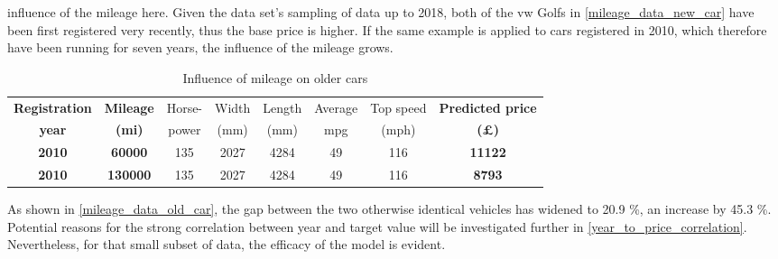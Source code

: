 influence of the mileage here.
Given the data set's sampling of data up to 2018, both of the \ac{vw} Golfs in \autoref{mileage_data_new_car} have been first registered very recently,
thus the base price is higher.
If the same example is applied to cars registered in 2010, which therefore have been running for seven years, the influence of the mileage grows.
\begin{table}[H]
    \begin{adjustbox}{width={\textwidth}}
        \begin{tabular}{|c|c|c|c|c|c|c|c|}
            \hline
            \textbf{Registration} & \textbf{Mileage} & Horse- & Width & Length & Average & Top speed & \textbf{Predicted price} \\[-1ex]
            \textbf{year}         & \textbf{(mi)}    & power  & (mm)  & (mm)   & mpg     & (mph)     & \textbf{(£)}             \\ \hline
            \textbf{2010}         & \textbf{60000}   & 135    & 2027  & 4284   & 49      & 116       & \textbf{11122}           \\\hline
            \textbf{2010}         & \textbf{130000}  & 135    & 2027  & 4284   & 49      & 116       & \textbf{8793}            \\\hline
        \end{tabular}
    \end{adjustbox}
    \caption{Influence of mileage on older cars}
    \label{mileage_data_old_car}
\end{table}
As shown in \autoref{mileage_data_old_car}, the gap between the two otherwise identical vehicles has widened to 20.9 \%, an increase by 45.3 \%.
Potential reasons for the strong correlation between year and target value will be investigated further in \autoref{year_to_price_correlation}.
Nevertheless, for that small subset of data, the efficacy of the model is evident.
